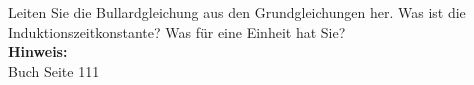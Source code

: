 \begin{question}[section=4,subsection=41,name={Bullard Gleichung},difficulty=,type=mdl,mode=exm,tags={}]
	Leiten Sie die Bullardgleichung aus den Grundgleichungen her. Was ist die Induktionszeitkonstante? Was für eine Einheit hat Sie?
	\\ \textbf{Hinweis:}\\
	Buch Seite 111
\end{question}
\begin{solution}
	
\end{solution}